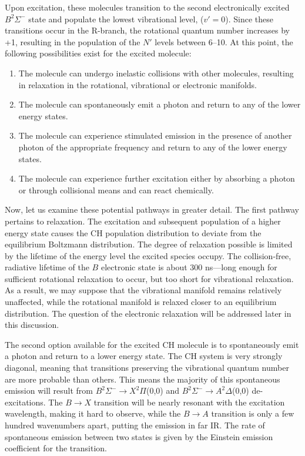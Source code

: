 Upon excitation, these molecules transition to the second electronically excited \(B^2\Sigma^-\) state and populate the lowest vibrational level, (\(v'=0\)).
Since these transitions occur in the R-branch, the rotational quantum number increases by +1, resulting in the population of the \(N'\) levels between 6--10.
At this point, the following possibilities exist for the excited molecule:

\begin{enumerate}
  \item The molecule can undergo inelastic collisions with other molecules, resulting in relaxation in the rotational, vibrational or electronic manifolds.
  \item The molecule can spontaneously emit a photon and return to any of the lower energy states.
  \item The molecule can experience stimulated emission in the presence of another photon of the appropriate frequency and return to any of the lower energy states.
  \item The molecule can experience further excitation either by absorbing a photon or through collisional means and can react chemically.
\end{enumerate}

Now, let us examine these potential pathways in greater detail.
The first pathway pertains to relaxation.
The excitation and subsequent population of a higher energy state causes the CH population distribution to deviate from the equilibrium Boltzmann distribution.
The degree of relaxation possible is limited by the lifetime of the energy level the excited species occupy.
The collision-free, radiative lifetime of the \(B\) electronic state is about 300 ns\cite{1996-luque-c}---long enough for sufficient rotational relaxation to occur, but too short for vibrational relaxation.
As a result, we may suppose that the vibrational manifold remains relatively unaffected, while the rotational manifold is relaxed closer to an equilibrium distribution.
The question of the electronic relaxation will be addressed later in this discussion.

The second option available for the excited CH molecule is to spontaneously emit a photon and return to a lower energy state.
The CH system is very strongly diagonal, meaning that transitions preserving the vibrational quantum number are more probable than others.
This means the majority of this spontaneous emission will result from \(B^2\Sigma^-\rightarrow X^2\Pi\)(0,0) and \(B^2\Sigma^-\rightarrow A^2\Delta\)(0,0) de-excitations.
The \(B\rightarrow X\) transition will be nearly resonant with the excitation wavelength, making it hard to observe, while the \(B\rightarrow A\) transition is only a few hundred wavenumbers apart, putting the emission in far IR.
The rate of spontaneous emission between two states is given by the Einstein emission coefficient for the transition.

